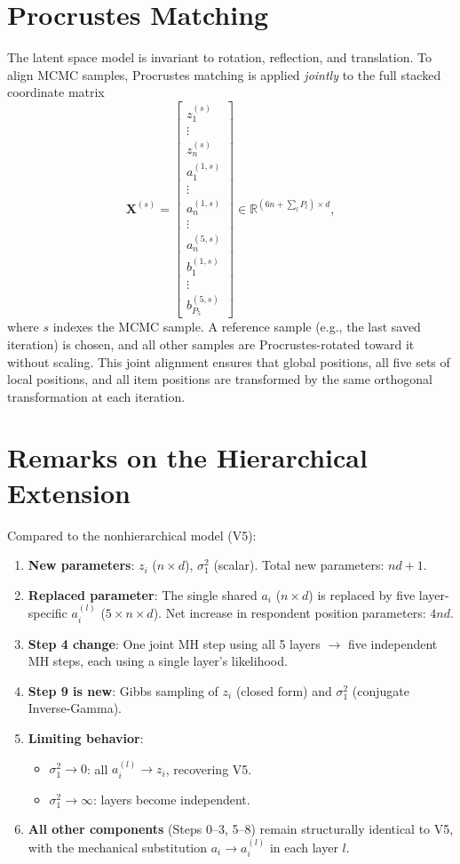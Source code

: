 \documentclass[11pt]{article}
\begin{document}
\section{Procrustes Matching}

The latent space model is invariant to rotation, reflection, and translation. To align MCMC samples, Procrustes matching is applied \emph{jointly} to the full stacked coordinate matrix
\[
\mathbf{X}^{(s)} = \begin{bmatrix} z_1^{(s)} \\ \vdots \\ z_n^{(s)} \\ a_1^{(1,s)} \\ \vdots \\ a_n^{(1,s)} \\ \vdots \\ a_n^{(5,s)} \\ b_1^{(1,s)} \\ \vdots \\ b_{P_5}^{(5,s)} \end{bmatrix}
\in \mathbb{R}^{(6n + \sum_l P_l) \times d},
\]
where $s$ indexes the MCMC sample. A reference sample (e.g., the last saved iteration) is chosen, and all other samples are Procrustes-rotated toward it without scaling. This joint alignment ensures that global positions, all five sets of local positions, and all item positions are transformed by the same orthogonal transformation at each iteration.

\section{Remarks on the Hierarchical Extension}

Compared to the nonhierarchical model (V5):
\begin{enumerate}[leftmargin=1.5em]
    \item \textbf{New parameters}: $z_i$ ($n \times d$), $\sigma_1^2$ (scalar). Total new parameters: $nd + 1$.
    \item \textbf{Replaced parameter}: The single shared $a_i$ ($n \times d$) is replaced by five layer-specific $a_i^{(l)}$ ($5 \times n \times d$). Net increase in respondent position parameters: $4nd$.
    \item \textbf{Step 4 change}: One joint MH step using all 5 layers $\to$ five independent MH steps, each using a single layer's likelihood.
    \item \textbf{Step 9 is new}: Gibbs sampling of $z_i$ (closed form) and $\sigma_1^2$ (conjugate Inverse-Gamma).
    \item \textbf{Limiting behavior}:
    \begin{itemize}[leftmargin=1em]
        \item $\sigma_1^2 \to 0$: all $a_i^{(l)} \to z_i$, recovering V5.
        \item $\sigma_1^2 \to \infty$: layers become independent.
    \end{itemize}
    \item \textbf{All other components} (Steps 0--3, 5--8) remain structurally identical to V5, with the mechanical substitution $a_i \to a_i^{(l)}$ in each layer $l$.
\end{enumerate}
\end{document}
